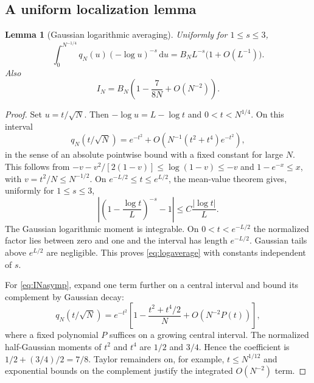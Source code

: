 \documentclass[11pt]{article}
\numberwithin{equation}{section}
\newtheorem{lemma}[theorem]{Lemma}
\theoremstyle{definition}\newtheorem{definition}[theorem]{Definition}
\theoremstyle{remark}\newtheorem{remark}[theorem]{Remark}
\newcommand{\dd}{\,\mathrm d}
\begin{document}
\subsection{A uniform localization lemma}
\begin{lemma}[Gaussian logarithmic averaging]\label{lem:logaverage}
Uniformly for $1\le s\le3$,
\begin{equation}\label{eq:logaverage}
 \int_0^{N^{-1/4}}q_N(u)(-\log u)^{-s}\dd u
 =B_NL^{-s}\bigl(1+O(L^{-1})\bigr).
\end{equation}
Also
\begin{equation}\label{eq:INasymp}
 I_N=B_N\left(1-\frac7{8N}+O(N^{-2})\right).
\end{equation}
\end{lemma}
\begin{proof}
Set $u=t/\sqrt N$. Then $-\log u=L-\log t$ and
$0<t<N^{1/4}$. On this interval
\[
 q_N(t/\sqrt N)=e^{-t^2}
 +O\left(N^{-1}(t^2+t^4)e^{-t^2}\right),
\]
in the sense of an absolute pointwise bound with a fixed constant for
large $N$. This follows from
$-v-v^2/[2(1-v)]\le\log(1-v)\le-v$ and
$1-e^{-x}\le x$, with $v=t^2/N\le N^{-1/2}$.
On $e^{-L/2}\le t\le e^{L/2}$, the mean-value theorem gives, uniformly
for $1\le s\le3$,
\[
 \left|\left(1-\frac{\log t}{L}\right)^{-s}-1\right|
 \le C\frac{|\log t|}{L}.
\]
The Gaussian logarithmic moment is integrable. On $0<t<e^{-L/2}$
the normalized factor lies between zero and one and the interval has
length $e^{-L/2}$. Gaussian tails above $e^{L/2}$ are negligible.
This proves \eqref{eq:logaverage} with constants independent of $s$.

For \eqref{eq:INasymp}, expand one term further on a central interval
and bound its complement by Gaussian decay:
\[
 q_N(t/\sqrt N)=e^{-t^2}
 \left[1-\frac{t^2+t^4/2}{N}+O(N^{-2}P(t))\right],
\]
where a fixed polynomial $P$ suffices on a growing central interval.
The normalized half-Gaussian moments of $t^2$ and $t^4$ are $1/2$ and
$3/4$. Hence the coefficient is $1/2+(3/4)/2=7/8$.
Taylor remainders on, for example, $t\le N^{1/12}$ and exponential
bounds on the complement justify the integrated $O(N^{-2})$ term.
\end{proof}
\end{document}
